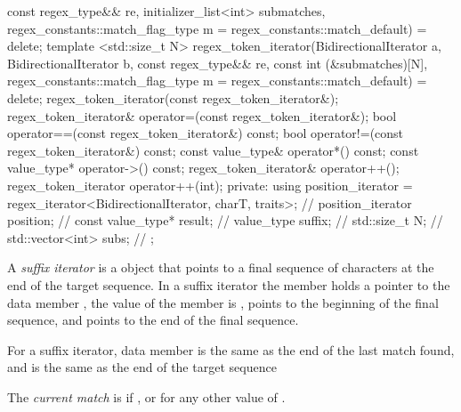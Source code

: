 \begin{codeblock}
{{                         const regex_type&& re,
                         initializer_list<int> submatches,
                         regex_constants::match_flag_type m =
                           regex_constants::match_default) = delete;
    template <std::size_t N>
    regex_token_iterator(BidirectionalIterator a, BidirectionalIterator b,
                         const regex_type&& re,
                         const int (&submatches)[N],
                         regex_constants::match_flag_type m =
                           regex_constants::match_default) = delete;                          
    regex_token_iterator(const regex_token_iterator&);
    regex_token_iterator& operator=(const regex_token_iterator&);
    bool operator==(const regex_token_iterator&) const;
    bool operator!=(const regex_token_iterator&) const;
    const value_type& operator*() const;
    const value_type* operator->() const;
    regex_token_iterator& operator++();
    regex_token_iterator operator++(int);
  private:
    using position_iterator =
          regex_iterator<BidirectionalIterator, charT, traits>; // \expos
    position_iterator position;                                 // \expos
    const value_type* result;                                   // \expos
    value_type suffix;                                          // \expos
    std::size_t N;                                              // \expos
    std::vector<int> subs;                                      // \expos
  };
}
\end{codeblock}

\pnum
A \textit{suffix iterator} is a  object
that points to a final sequence of characters at
the end of the target sequence. In a suffix iterator the
member  holds a pointer to the data
member , the value of the member 
is ,  points to the beginning of the
final sequence, and  points to the end of the
final sequence. 

\pnum
\begin{note} For a suffix iterator, data
member  is the same as the end of the last match
found, and  is the same as the end of the target
sequence \end{note}

\pnum
The \textit{current match} is  if , or
 for any other value of .

